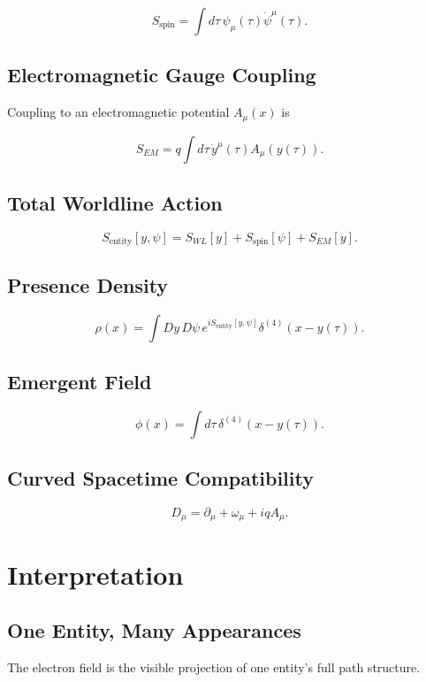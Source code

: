 \documentclass[12pt]{article}
\begin{document}
\[
S_{\text{spin}} = \int d\tau \, \psi_\mu(\tau)\dot{\psi}^\mu(\tau).
\]



\subsection{Electromagnetic Gauge Coupling}
Coupling to an electromagnetic potential $A_\mu(x)$ is


\[
S_{EM} = q \int d\tau \, \dot{y}^\mu(\tau) A_\mu(y(\tau)).
\]



\subsection{Total Worldline Action}


\[
S_{\text{entity}}[y,\psi] = S_{WL}[y] + S_{\text{spin}}[\psi] + S_{EM}[y].
\]



\subsection{Presence Density}


\[
\rho(x) = \int Dy \, D\psi \, e^{iS_{\text{entity}}[y,\psi]} \delta^{(4)}(x - y(\tau)).
\]



\subsection{Emergent Field}


\[
\phi(x) = \int d\tau \, \delta^{(4)}(x - y(\tau)).
\]



\subsection{Curved Spacetime Compatibility}


\[
D_\mu = \partial_\mu + \omega_\mu + iqA_\mu.
\]



\section{Interpretation}

\subsection{One Entity, Many Appearances}
The electron field is the visible projection of one entity’s full path structure.
\end{document}
